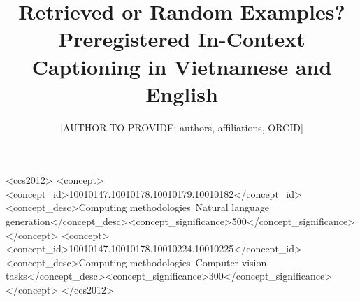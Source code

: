 \documentclass[manuscript,screen]{acmart}
\begin{document}
\title{Retrieved or Random Examples? Preregistered In-Context Captioning in Vietnamese and English}
\author{[AUTHOR TO PROVIDE: authors, affiliations, ORCID]}
\begin{abstract}\end{abstract}
\begin{CCSXML}
<ccs2012>
<concept><concept_id>10010147.10010178.10010179.10010182</concept_id><concept_desc>Computing methodologies~Natural language generation</concept_desc><concept_significance>500</concept_significance></concept>
<concept><concept_id>10010147.10010178.10010224.10010225</concept_id><concept_desc>Computing methodologies~Computer vision tasks</concept_desc><concept_significance>300</concept_significance></concept>
</ccs2012>
\end{CCSXML}
\maketitle



\end{document}
